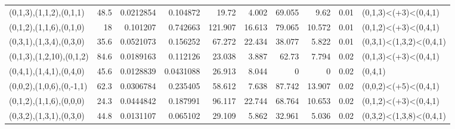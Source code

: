 \begin{tabular}{lrrrrrrrrl}
 (0,1,3),(1,1,2),(0,1,1)    &   48.5 & 0.0212854 &  0.104872  &       19.72  &      4.002 &           69.055 &          9.62  &     0.01 & (0,1,3)<(+3)<(0,4,1)    \\
 (0,1,2),(1,1,6),(0,1,0)    &   18   & 0.101207  &  0.742663  &      121.907 &     16.613 &           79.065 &         10.572 &     0.01 & (0,1,2)<(+3)<(0,4,1)    \\
 (0,3,1),(1,3,4),(0,3,0)    &   35.6 & 0.0521073 &  0.156252  &       67.272 &     22.434 &           38.077 &          5.822 &     0.01 & (0,3,1)<(1,3,2)<(0,4,1) \\
 (0,1,3),(1,2,10),(0,1,2)   &   84.6 & 0.0189163 &  0.112126  &       23.038 &      3.887 &           62.73  &          7.794 &     0.02 & (0,1,3)<(+3)<(0,4,1)    \\
 (0,4,1),(1,4,1),(0,4,0)    &   45.6 & 0.0128839 &  0.0431088 &       26.913 &      8.044 &            0     &          0     &     0.02 & (0,4,1)                 \\
 (0,0,2),(1,0,6),(0,-1,1)   &   62.3 & 0.0306784 &  0.235405  &       58.612 &      7.638 &           87.742 &         13.907 &     0.02 & (0,0,2)<(+5)<(0,4,1)    \\
 (0,1,2),(1,1,6),(0,0,0)    &   24.3 & 0.0444842 &  0.187991  &       96.117 &     22.744 &           68.764 &         10.653 &     0.02 & (0,1,2)<(+3)<(0,4,1)    \\
 (0,3,2),(1,3,1),(0,3,0)    &   44.8 & 0.0131107 &  0.065102  &       29.109 &      5.862 &           32.961 &          5.036 &     0.02 & (0,3,2)<(1,3,8)<(0,4,1) \\
\hline
\end{tabular}
